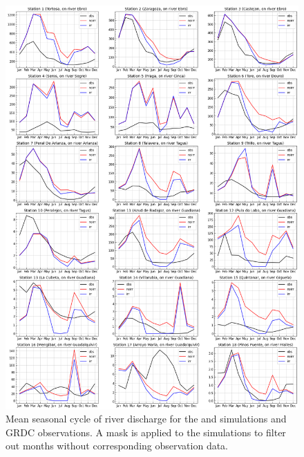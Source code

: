 \begin{figure}[htbp]
    \centering
    \includegraphics[width=\textwidth]{images/chap4/article/18_stations_SC.png}
    \caption{Mean seasonal cycle of river discharge for the \irr and \noirr simulations and GRDC observations. A mask is applied to the simulations to filter out months without corresponding observation data.}
    \label{fig:SC_discharge_18stations}
\end{figure}



